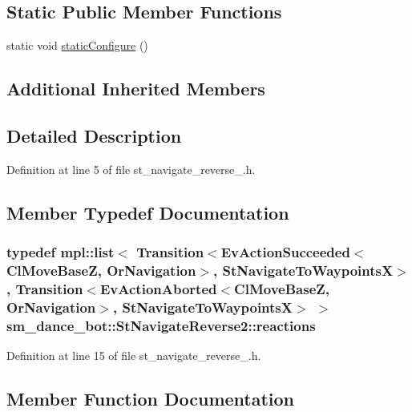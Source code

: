 \subsection*{Static Public Member Functions}
\begin{DoxyCompactItemize}
\item 
static void \hyperlink{structsm__dance__bot_1_1StNavigateReverse2_ae4809f28ccc5378f7a8f3c829d29d925}{static\+Configure} ()
\end{DoxyCompactItemize}
\subsection*{Additional Inherited Members}


\subsection{Detailed Description}


Definition at line 5 of file st\+\_\+navigate\+\_\+reverse\+\_.\+h.



\subsection{Member Typedef Documentation}
\subsubsection[{\texorpdfstring{reactions}{reactions}}]{\setlength{\rightskip}{0pt plus 5cm}typedef mpl\+::list$<$ Transition$<${\bf Ev\+Action\+Succeeded}$<${\bf Cl\+Move\+BaseZ}, {\bf Or\+Navigation}$>$, {\bf St\+Navigate\+To\+WaypointsX}$>$, Transition$<${\bf Ev\+Action\+Aborted}$<${\bf Cl\+Move\+BaseZ}, {\bf Or\+Navigation}$>$, {\bf St\+Navigate\+To\+WaypointsX}$>$ $>$ {\bf sm\+\_\+dance\+\_\+bot\+::\+St\+Navigate\+Reverse2\+::reactions}}\hypertarget{structsm__dance__bot_1_1StNavigateReverse2_a629dbeb24a7b120d7dfebeb4b9630d64}{}\label{structsm__dance__bot_1_1StNavigateReverse2_a629dbeb24a7b120d7dfebeb4b9630d64}


Definition at line 15 of file st\+\_\+navigate\+\_\+reverse\+\_.\+h.



\subsection{Member Function Documentation}

